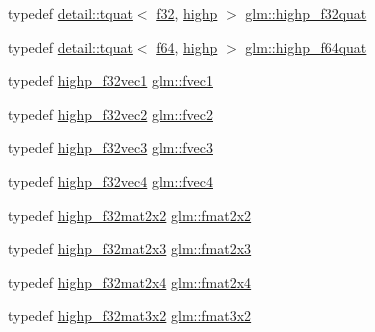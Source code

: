 \begin{DoxyCompactItemize}
\item 
typedef \hyperlink{structglm_1_1detail_1_1tquat}{detail\+::tquat}$<$ \hyperlink{group__gtc__type__precision_ga0ec999b57f5330d9021256e96038df04}{f32}, \hyperlink{namespaceglm_a0f04f086094c747d227af4425893f545ac6f7eab42eacbb10d59a58e95e362074}{highp} $>$ \hyperlink{group__gtc__type__precision_ga26eef27d2efbd759e7e93c40672402e9}{glm\+::highp\+\_\+f32quat}
\item 
typedef \hyperlink{structglm_1_1detail_1_1tquat}{detail\+::tquat}$<$ \hyperlink{group__gtc__type__precision_ga2bba392e555124b36cde6abba349bab3}{f64}, \hyperlink{namespaceglm_a0f04f086094c747d227af4425893f545ac6f7eab42eacbb10d59a58e95e362074}{highp} $>$ \hyperlink{group__gtc__type__precision_ga9372e8b60f401fd94aba637b3ed17cfc}{glm\+::highp\+\_\+f64quat}
\item 
typedef \hyperlink{group__gtc__type__precision_gac8be8ce31b9df0a5005d7c7458a3d03e}{highp\+\_\+f32vec1} \hyperlink{group__gtc__type__precision_gab927d62f22fa57461367011950cec650}{glm\+::fvec1}
\item 
typedef \hyperlink{group__gtc__type__precision_gabba3e1b3ae0bcaa7aaac573c08c2f8d3}{highp\+\_\+f32vec2} \hyperlink{group__gtc__type__precision_gaafd518792a4646c7bb60aabc62a4684c}{glm\+::fvec2}
\item 
typedef \hyperlink{group__gtc__type__precision_ga581a4a4eb1f3a269d16af0c4e2d8daf4}{highp\+\_\+f32vec3} \hyperlink{group__gtc__type__precision_ga33b85a14a8f68ec99029ff13db6af369}{glm\+::fvec3}
\item 
typedef \hyperlink{group__gtc__type__precision_ga53d3c1a17e2e6f26ee5ad1e8879d710e}{highp\+\_\+f32vec4} \hyperlink{group__gtc__type__precision_ga55d1365630d3b3ecf7c7f4e7c29a9cb1}{glm\+::fvec4}
\item 
typedef \hyperlink{group__gtc__type__precision_gaf3a2cc948ca6fd168391138ce6fdd100}{highp\+\_\+f32mat2x2} \hyperlink{group__gtc__type__precision_gada7823c23ae249dccaecb5a016c667f4}{glm\+::fmat2x2}
\item 
typedef \hyperlink{group__gtc__type__precision_ga53613c1b93f81207065a8a935ff02a81}{highp\+\_\+f32mat2x3} \hyperlink{group__gtc__type__precision_ga087d875cd4e384f101a28a4caf8ccd94}{glm\+::fmat2x3}
\item 
typedef \hyperlink{group__gtc__type__precision_ga9689dbe21bc976ca8069c63300b5887e}{highp\+\_\+f32mat2x4} \hyperlink{group__gtc__type__precision_gaf3af7a2f10aaf8028a95b7232b24d84e}{glm\+::fmat2x4}
\item 
typedef \hyperlink{group__gtc__type__precision_gaf36b2b34ea881977c61491b0d3b25a28}{highp\+\_\+f32mat3x2} \hyperlink{group__gtc__type__precision_ga723b6e3dd4ff1c0d76d3c9f72ea0d9a7}{glm\+::fmat3x2}

\end{DoxyCompactItemize}

